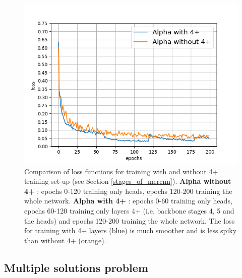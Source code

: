 \begin{figure}[h]
\centering
\includegraphics[width=140mm]{img/4+_losses.png}
\caption{Comparison of loss functions for training with and without 4+ training set-up (see Section \ref{stages_of_mercnn}). \textbf{Alpha without 4+} : epochs 0-120 training only heads, epochs 120-200 training the whole network. \textbf{Alpha with 4+} : epochs 0-60 training only heads, epochs 60-120 training only layers 4+ (i.e. backbone stages 4, 5 and the heads) and epochs 120-200 training the whole network. The loss for training with 4+ layers (blue) is much smoother and is less spiky than without 4+ (orange). }
\label{four_plus_losses}
\end{figure}

\subsection{Multiple solutions problem}

